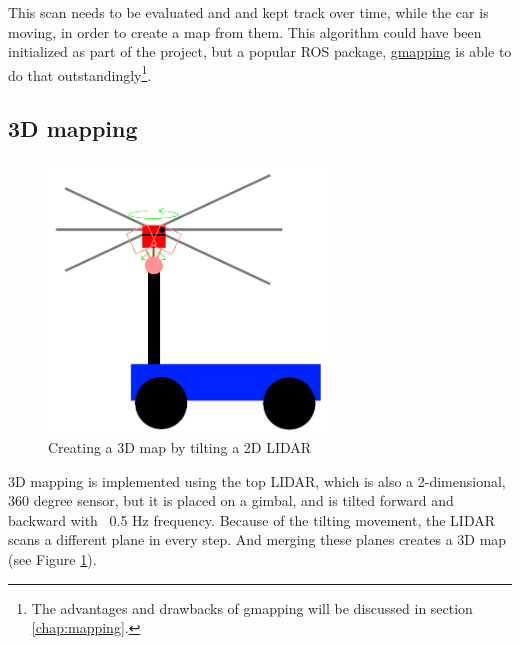 This scan needs to be evaluated and and kept track over time, while the car is moving, in order to create a map from them. This algorithm could have been initialized as part of the project, but a popular ROS package, \href{http://wiki.ros.org/gmapping}{gmapping} is able to do that outstandingly\footnote{The advantages and drawbacks of gmapping will be discussed in section \ref{chap:mapping}.}.

\subsection{3D mapping}

\begin{figure}[!ht]
	\centering
	\includegraphics[height=72mm]{figures/raw/3D_lidar.png}
	\caption{Creating a 3D map by tilting a 2D LIDAR}
	\label{tilt_lidar}
\end{figure}

3D mapping is implemented using the top LIDAR, which is also a 2-dimensional, 360 degree sensor, but it is placed on a gimbal, and is tilted forward and backward with ~0.5 Hz frequency. Because of the tilting movement, the LIDAR scans a different plane in every step. And merging these planes creates a 3D map (see Figure \ref{tilt_lidar}).

